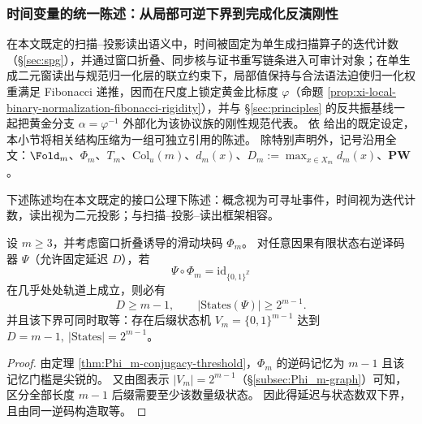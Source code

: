 \subsubsection{时间变量的统一陈述：从局部可逆下界到完成化反演刚性}\label{subsubsec:xi-time-protocol-conclusions}
在本文既定的扫描--投影读出语义中，时间被固定为单生成扫描算子的迭代计数（\S\ref{sec:spg}），并通过窗口折叠、同步核与证书重写链条进入可审计对象；在单生成二元窗读出与规范归一化层的联立约束下，局部值保持与合法语法迫使归一化权重满足 Fibonacci 递推，因而在尺度上锁定黄金比标度 \(\varphi\)（命题 \ref{prop:xi-local-binary-normalization-fibonacci-rigidity}），并与 \S\ref{sec:principles} 的反共振基线一起把黄金分支 \(\alpha=\varphi^{-1}\) 外部化为该协议族的刚性规范代表。
依 \cite{Internal2026POMGenerativeAddressThreeRegisterBridgeRH} 给出的既定设定，本小节将相关结构压缩为一组可独立引用的陈述。
除特别声明外，记号沿用全文：\(\Fold_m\)、\(\Phi_m\)、\(T_m\)、\(\mathrm{Col}_u(m)\)、\(d_m(x)\)、\(D_m:=\max_{x\in X_m}d_m(x)\)、\(\mathbf{PW}\)。
\par
下述陈述均在本文既定的接口公理下陈述：概念视为可寻址事件，时间视为迭代计数，读出视为二元投影；与扫描--投影--读出框架相容。



\begin{theorem}\label{thm:xi-time-min-delay-min-states}
设 \(m\ge 3\)，并考虑窗口折叠诱导的滑动块码 \(\Phi_m\)。
对任意因果有限状态右逆译码器 \(\Psi\)（允许固定延迟 \(D\)），若
\[
\Psi\circ\Phi_m=\mathrm{id}_{\{0,1\}^{\mathbb Z}}
\]
在几乎处处轨道上成立，则必有
\[
D\ge m-1,
\qquad
|\mathrm{States}(\Psi)|\ge 2^{m-1}.
\]
并且该下界可同时取等：存在后缀状态机 \(V_m=\{0,1\}^{m-1}\) 达到
\(
D=m-1,\ |\mathrm{States}|=2^{m-1}
\)。
\end{theorem}

\begin{proof}
由定理 \ref{thm:Phi_m-conjugacy-threshold}，\(\Phi_m\) 的逆码记忆为 \(m-1\) 且该记忆门槛是尖锐的。
又由图表示 \(|V_m|=2^{m-1}\)（\S\ref{subsec:Phi_m-graph}）可知，区分全部长度 \(m-1\) 后缀需要至少该数量级状态。
因此得延迟与状态数双下界，且由同一逆码构造取等。
\end{proof}

